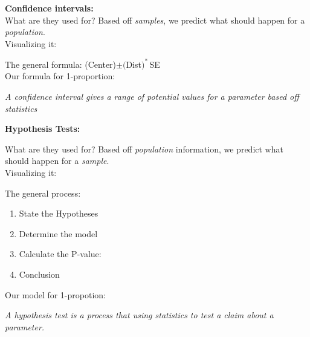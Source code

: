\documentclass[12pt]{amsart}
\theoremstyle{definition}
\begin{document}
 \begin{minipage}[t]{0.5\textwidth}
  \begin{framed}\textbf{Confidence intervals:}\\
  
  What are they used for? Based off \emph{samples}, we predict what should happen for a \emph{population}.\\
  
  Visualizing it: \vspace{0.5in}
  
  The general formula: (Center)$\pm($Dist$)^*$\,SE\\
  
  Our formula for 1-proportion: \vspace{2.2in}
  
  \emph{A confidence interval gives a range of potential values for a parameter based off statistics}
  \end{framed}
 \end{minipage}
 \begin{minipage}[t]{0.5\textwidth}
  \begin{framed}\textbf{Hypothesis Tests:}\\
  
  \vfill
  
  What are they used for? Based off \emph{population} information, we predict what should happen for a \emph{sample}.\\
  
  Visualizing it: \vspace{0.5in}
  
  The general process:
  \begin{enumerate}
   \item State the Hypotheses
   \item Determine the model
   \item Calculate the P-value:\vspace{0.5in}
   \item Conclusion
  \end{enumerate}

  
  Our model for 1-propotion: \vspace{0.5in}
 
  \emph{A hypothesis test is a process that using statistics to test a claim about a parameter.}
  \end{framed}
 \end{minipage}
 
 \vspace{0.2in}
 
\end{document}
